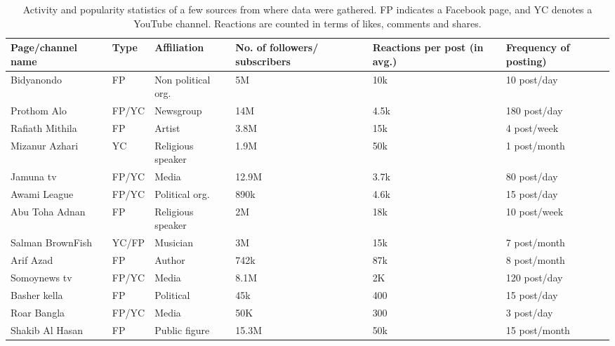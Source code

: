 \documentclass[11pt]{article}
\begin{document}
\begin{table}[t!]
\small
\begin{center}

\begin{tabular}{L{3cm}C{1.2cm}C{2.5cm}C{3cm}C{2cm}C{2cm}}
\toprule
 \textbf{Page/channel name}& \textbf{Type} &\textbf{Affiliation}            &\textbf{ No. of followers/ subscribers}   & \textbf{Reactions per post (in avg.)} & 
 \textbf{Frequency of posting)}\\ \hline
 
 Bidyanondo & FP & Non political org. & 5M  & 10k & 10 post/day\\
  
 Prothom Alo & FP/YC & Newsgroup & 14M  & 4.5k & 180 post/day\\
 
Rafiath Mithila & FP & Artist & 3.8M  & 15k & 4 post/week\\
 
 Mizanur Azhari & YC & Religious speaker & 1.9M & 50k & 1 post/month\\
 
 Jamuna tv & FP/YC & Media  & 12.9M & 3.7k & 80 post/day\\
 
 
 Awami League & FP/YC & Political org. & 890k & 4.6k & 15 post/day\\
 
 Abu Toha Adnan & FP & Religious speaker & 2M & 18k & 10 post/week\\
 
 Salman BrownFish & YC/FP & Musician & 3M & 15k & 7 post/month \\
 
 
 Arif Azad & FP & Author & 742k & 87k & 8 post/month\\
 
 Somoynews tv& FP/YC & Media  & 8.1M & 2K & 120 post/day \\ 
 
  Basher kella & FP & Political & 45k & 400 & 15 post/day\\
  
  Roar Bangla & FP/YC & Media & 50K & 300 & 3 post/day\\
  
  Shakib Al Hasan & FP & Public figure & 15.3M & 50k & 15 post/month\\ 
 
\bottomrule
\end{tabular}
\caption{Activity and popularity statistics of a few sources from where data were gathered. FP indicates a Facebook page, and YC denotes a YouTube channel. Reactions are counted in terms of likes, comments and shares.}
\label{data-sources}
\end{center}
\end{table}
\end{document}
